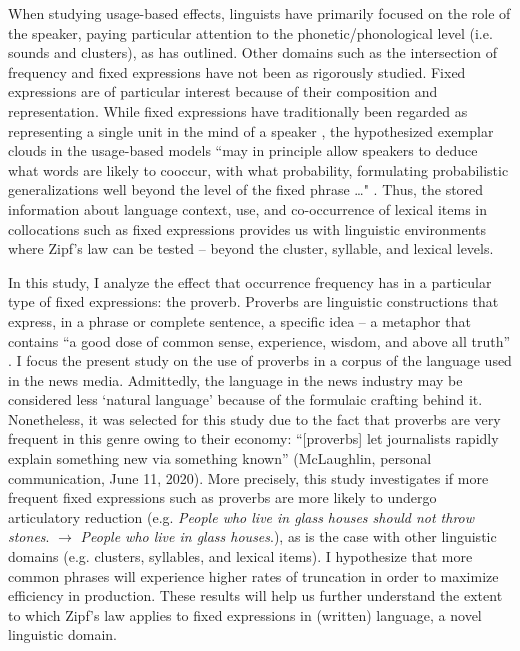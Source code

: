 \documentclass[output=paper,colorlinks,citecolor=brown,draftmode]{langscibook}
\begin{document}
When studying usage-based effects, linguists have primarily focused on the role of the speaker, paying particular attention to the phonetic/phonological level (i.e. sounds and clusters), as \citet{bybee2002phonological} has outlined. Other domains such as the intersection of frequency and fixed expressions have not been as rigorously studied. Fixed expressions are of particular interest because of their composition and representation. While fixed expressions have traditionally been regarded as representing a single unit in the mind of a speaker \citep[see][]{sinclair1991corpus}, the hypothesized exemplar clouds in the usage-based models ``may in principle allow speakers to deduce what words are likely to cooccur, with what probability, formulating probabilistic generalizations well beyond the level of the fixed phrase \ldots" \citep[528]{erker2012role}. Thus, the stored information about language context, use, and co-occurrence of lexical items in collocations such as fixed expressions provides us with linguistic environments where Zipf's law can be tested -- beyond the cluster, syllable, and lexical levels.

In this study, I analyze the effect that occurrence frequency has in a particular type of fixed expressions: the proverb. Proverbs are linguistic constructions that express, in a phrase or complete sentence, a specific idea -- a metaphor that contains ``a good dose of common sense, experience, wisdom, and above all truth'' \citep[15]{mieder1989american}. I focus the present study on the use of proverbs in a corpus of the language used in the news media. Admittedly, the language in the news industry may be considered less `natural language' because of the formulaic crafting behind it. Nonetheless,  it was selected for this study due to the fact that proverbs are very frequent in this genre owing to their economy: ``[proverbs] let journalists rapidly explain something new via something known'' (McLaughlin, personal communication, June 11, 2020). More precisely, this study investigates if more frequent fixed expressions such as proverbs are more likely to undergo articulatory reduction (e.g. \textit{People who live in glass houses should not throw stones}. $\rightarrow$ \textit{People who live in glass houses}.), as is the case with other linguistic domains (e.g. clusters, syllables, and lexical items). I hypothesize that more common phrases will experience higher rates of truncation in order to maximize efficiency in production. These results will help us further understand the extent to which Zipf's law applies to fixed expressions in (written) language, a novel linguistic domain.
\end{document}
